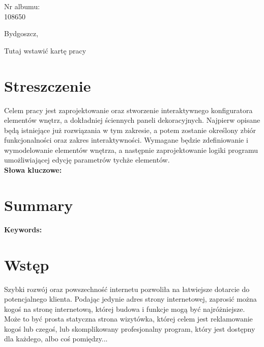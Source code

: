 \documentclass{article} %
\begin{document}
\begin{minipage}{2in}
Nr albumu: \\
108650
\end{minipage}

\begin{center}
 Bydgoszcz,
\end{center}


\newpage

\hspace{0pt}
\vfill

\begin{center}
\Huge Tutaj wstawić kartę pracy
\end{center}

\vfill
\hspace{0pt}

\newpage

\section*{Streszczenie}
Celem pracy jest zaprojektowanie oraz stworzenie interaktywnego konfiguratora elementów wnętrz, a dokładniej ściennych paneli dekoracyjnych. Najpierw opisane będą istniejące już rozwiązania w tym zakresie, a potem zostanie określony zbiór funkcjonalności oraz zakres interaktywności. Wymagane będzie zdefiniowanie i wymodelowanie elementów wnętrza, a następnie zaprojektowanie logiki programu umożliwiającej edycję parametrów tychże elementów.
\\

\textbf{Słowa kluczowe:}

\section*{Summary}

\textbf{Keywords:}

\newpage

\tableofcontents

\newpage

\section{Wstęp}


Szybki rozwój oraz powszechność internetu pozwoliła na łatwiejsze dotarcie do potencjalnego klienta. Podając jedynie adres strony internetowej, zaprosić można kogoś na stronę internetową, której budowa i funkcje mogą być najróżniejsze. Może to być prosta statyczna strona wizytówka, której celem jest reklamowanie kogoś lub czegoś, lub skomplikowany profesjonalny program, który jest dostępny dla każdego, albo coś pomiędzy...
\\
\end{document}

